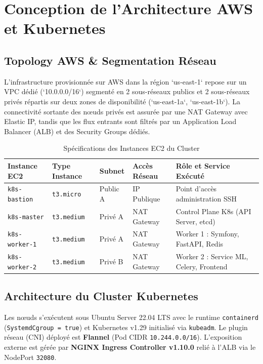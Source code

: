 \documentclass[12pt,a4paper]{report}
\begin{document}
\chapter{Conception de l'Architecture AWS et Kubernetes}

\section{Topology AWS & Segmentation Réseau}
L'infrastructure provisionnée sur AWS dans la région `us-east-1` repose sur un VPC dédié (`10.0.0.0/16`) segmenté en 2 sous-réseaux publics et 2 sous-réseaux privés répartis sur deux zones de disponibilité (`us-east-1a`, `us-east-1b`). La connectivité sortante des nœuds privés est assurée par une NAT Gateway avec Elastic IP, tandis que les flux entrants sont filtrés par un Application Load Balancer (ALB) et des Security Groups dédiés.

\begin{table}[H]
\centering
\caption{Spécifications des Instances EC2 du Cluster}
\label{tab:ec2}
\begin{tabularx}{\textwidth}{llllX}
\toprule
\textbf{Instance EC2} & \textbf{Type Instance} & \textbf{Subnet} & \textbf{Accès Réseau} & \textbf{Rôle et Service Exécuté} \\
\midrule
\texttt{k8s-bastion} & \texttt{t3.micro} & Public A & IP Publique & Point d'accès administration SSH \\
\texttt{k8s-master} & \texttt{t3.medium} & Privé A & NAT Gateway & Control Plane K8s (API Server, etcd) \\
\texttt{k8s-worker-1} & \texttt{t3.medium} & Privé A & NAT Gateway & Worker 1 : Symfony, FastAPI, Redis \\
\texttt{k8s-worker-2} & \texttt{t3.medium} & Privé B & NAT Gateway & Worker 2 : Service ML, Celery, Frontend \\
\bottomrule
\end{tabularx}
\end{table}

\section{Architecture du Cluster Kubernetes}
Les nœuds s'exécutent sous Ubuntu Server 22.04 LTS avec le runtime \texttt{containerd} (\texttt{SystemdCgroup = true}) et Kubernetes v1.29 initialisé via \texttt{kubeadm}. Le plugin réseau (CNI) déployé est \textbf{Flannel} (Pod CIDR \texttt{10.244.0.0/16}). L'exposition externe est gérée par \textbf{NGINX Ingress Controller v1.10.0} relié à l'ALB via le NodePort \texttt{32080}.
\end{document}
